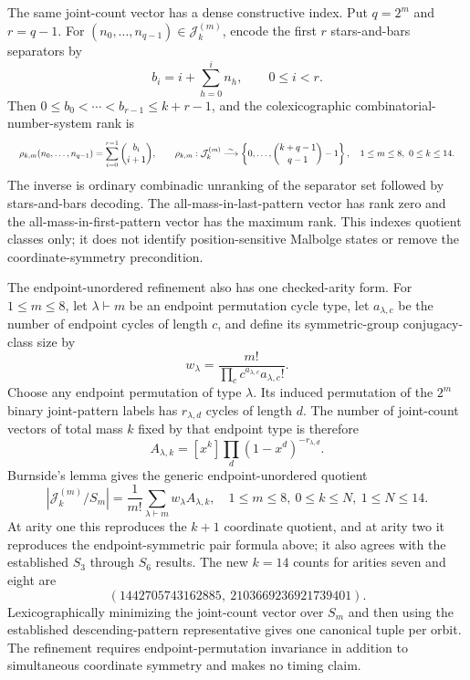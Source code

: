 \documentclass{article}
\newcommand{\fitmath}[1]{\resizebox{0.99\linewidth}{!}{$\displaystyle #1$}}
\begin{document}
The same joint-count vector has a dense constructive index. Put $q=2^m$ and
$r=q-1$. For $(n_0,\ldots,n_{q-1})\in\mathcal{J}^{(m)}_k$, encode the first
$r$ stars-and-bars separators by
\[
  b_i=i+\sum_{h=0}^{i}n_h,\qquad 0\leq i<r.
\]
Then $0\leq b_0<\cdots<b_{r-1}\leq k+r-1$, and the colexicographic
combinatorial-number-system rank is
\begin{equation}
  \fitmath{%
    \rho_{k,m}(n_0,\ldots,n_{q-1})
      =\sum_{i=0}^{r-1}\binom{b_i}{i+1},
    \qquad
    \rho_{k,m}:\mathcal{J}^{(m)}_k
      \overset{\sim}{\longrightarrow}
      \left\{0,\ldots,\binom{k+q-1}{q-1}-1\right\},
    \quad 1\leq m\leq8,\ 0\leq k\leq14.
  }
  \label{eq:optimization-crazy-preimage-cube-ordered-tuple-ranking}
\end{equation}
The inverse is ordinary combinadic unranking of the separator set followed by
stars-and-bars decoding. The all-mass-in-last-pattern vector has rank zero and
the all-mass-in-first-pattern vector has the maximum rank. This indexes quotient
classes only; it does not identify position-sensitive Malbolge states or remove
the coordinate-symmetry precondition.

The endpoint-unordered refinement also has one checked-arity form. For
$1\leq m\leq8$, let $\lambda\vdash m$ be an endpoint permutation cycle type,
let $a_{\lambda,c}$ be the number of endpoint cycles of length $c$, and define
its symmetric-group conjugacy-class size by
\[
  w_\lambda=\frac{m!}{\prod_c c^{a_{\lambda,c}}a_{\lambda,c}!}.
\]
Choose any endpoint permutation of type $\lambda$. Its induced permutation of
the $2^m$ binary joint-pattern labels has $r_{\lambda,d}$ cycles of length $d$.
The number of joint-count vectors of total mass $k$ fixed by that endpoint type
is therefore
\[
  A_{\lambda,k}=[x^k]\prod_d(1-x^d)^{-r_{\lambda,d}}.
\]
Burnside's lemma gives the generic endpoint-unordered quotient
\begin{equation}
  \left|\mathcal{J}^{(m)}_k/S_m\right|
    =\frac{1}{m!}\sum_{\lambda\vdash m}w_\lambda A_{\lambda,k},
  \quad 1\leq m\leq8,\ 0\leq k\leq N,\ 1\leq N\leq14.
  \label{eq:optimization-crazy-preimage-cube-unordered-tuple-quotient}
\end{equation}
At arity one this reproduces the $k+1$ coordinate quotient, and at arity two
it reproduces the endpoint-symmetric pair formula above; it also agrees with
the established $S_3$ through $S_6$ results. The new $k=14$ counts for arities
seven and eight are
\begin{equation*}
  (1442705743162885,\ 2103669236921739401).
\end{equation*}
Lexicographically minimizing the joint-count vector over $S_m$ and then using
the established descending-pattern representative gives one canonical tuple per
orbit. The refinement requires endpoint-permutation invariance in addition to
simultaneous coordinate symmetry and makes no timing claim.
\end{document}
